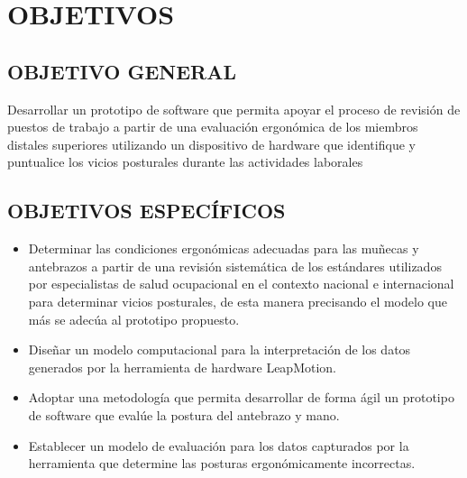 \chapter{OBJETIVOS}
\section{OBJETIVO GENERAL}
Desarrollar un prototipo de software que permita apoyar el proceso de revisión de puestos de trabajo a partir de una evaluación ergonómica de los miembros distales superiores utilizando un dispositivo de hardware que identifique y puntualice los vicios posturales durante las actividades laborales
 
\section{OBJETIVOS ESPECÍFICOS}
\begin{itemize}
    \item Determinar las condiciones ergonómicas adecuadas para las muñecas y antebrazos a partir de una revisión sistemática de los estándares utilizados por especialistas de salud ocupacional en el contexto nacional e internacional para determinar vicios posturales, de esta manera precisando el modelo que más se adecúa al prototipo propuesto.
    \item Diseñar un modelo computacional para la interpretación de los datos generados por la herramienta de hardware LeapMotion.
    \item Adoptar una metodología que permita desarrollar de forma ágil un prototipo de software que evalúe la postura del antebrazo y mano. 
    \item Establecer un modelo de evaluación para los datos capturados por la herramienta que determine las posturas ergonómicamente incorrectas. 
\end{itemize}